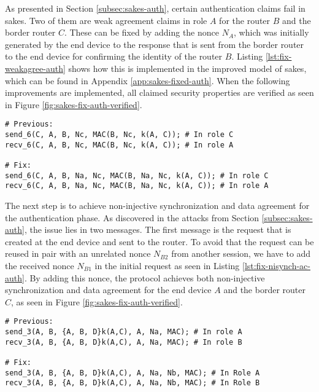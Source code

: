 As presented in Section \ref{subsec:sakes-auth}, certain authentication claims fail in \gls{sakes}. Two of them are weak agreement claims in role $A$ for the router $B$ and the border router $C$. These can be fixed by adding the nonce $N_A$, which was initially generated by the end device to the response that is sent from the border router to the end device for confirming the identity of the router $B$. Listing \ref{lst:fix-weakagree-auth} shows how this is implemented in the improved model of \gls{sakes}, which can be found in Appendix \ref{app:sakes-fixed-auth}. When the following improvements are implemented, all claimed security properties are verified as seen in Figure \ref{fig:sakes-fix-auth-verified}.

\newpage

\begin{lstlisting}[caption={[Fix to the SAKES protocol to provide weak agreement for the end device in the authentication phase.]Fix to the SAKES protocol to provide weak agreement for the end device in the authentication phase. The changes to the protocol are highlighted with blue.}, label={lst:fix-weakagree-auth}, style=code-improvements-sakes-1]
# Previous:
send_6(C, A, B, Nc, MAC(B, Nc, k(A, C)); # In role C
recv_6(C, A, B, Nc, MAC(B, Nc, k(A, C)); # In role A
	
# Fix:
send_6(C, A, B, Na, Nc, MAC(B, Na, Nc, k(A, C)); # In role C
recv_6(C, A, B, Na, Nc, MAC(B, Na, Nc, k(A, C)); # In role A
\end{lstlisting}

The next step is to achieve non-injective synchronization and data agreement for the authentication phase. As discovered in the attacks from Section \ref{subsec:sakes-auth}, the issue lies in two messages. The first message is the request that is created at the end device and sent to the router. To avoid that the request can be reused in pair with an unrelated nonce $N_{B2}$ from another session, we have to add the received nonce $N_{B1}$ in the initial request as seen in Listing \ref{lst:fix-nisynch-ac-auth}. By adding this nonce, the protocol achieves both non-injective synchronization and data agreement for the end device $A$ and the border router $C$, as seen in Figure \ref{fig:sakes-fix-auth-verified}.\\

\begin{lstlisting}[caption={[Fix to the SAKES protocol to provide non-injective synchronization and data agreement for the end device and the border router during the authentication phase.]Fix to the SAKES protocol to provide non-injective synchronization and data agreement for the end device and the border router during the authentication phase. The changes to the protocol are highlighted in blue.}, label={lst:fix-nisynch-ac-auth}, style=code-improvements-sakes-2]
# Previous:
send_3(A, B, {A, B, D}k(A,C), A, Na, MAC); # In role A
recv_3(A, B, {A, B, D}k(A,C), A, Na, MAC); # In role B
	
# Fix:
send_3(A, B, {A, B, D}k(A,C), A, Na, Nb, MAC); # In Role A
recv_3(A, B, {A, B, D}k(A,C), A, Na, Nb, MAC); # In Role B
\end{lstlisting}


